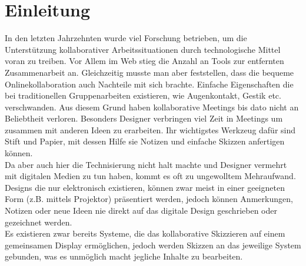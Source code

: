 \cleardoublepage
{} %

\hfill

\vfill

\begingroup
\let\cleardoublepage\relax
\chapter*{Einleitung} \label{app:introduction}
In den letzten Jahrzehnten wurde viel Forschung betrieben, um die Unterstützung kollaborativer Arbeitssituationen durch technologische Mittel voran zu treiben. Vor Allem im Web stieg die Anzahl an Tools zur entfernten Zusammenarbeit an. Gleichzeitig musste man aber feststellen, dass die bequeme Onlinekollaboration auch Nachteile mit sich brachte. Einfache Eigenschaften die bei traditionellen Gruppenarbeiten existieren, wie Augenkontakt, Gestik etc. verschwanden. Aus diesem Grund haben kollaborative Meetings bis dato nicht an Beliebtheit verloren. Besonders Designer verbringen viel Zeit in Meetings um zusammen mit anderen Ideen zu erarbeiten. Ihr wichtigstes Werkzeug dafür sind Stift und Papier, mit dessen Hilfe sie Notizen und einfache Skizzen anfertigen können.\\
Da aber auch hier die Technisierung nicht halt machte und Designer vermehrt mit digitalen Medien zu tun haben, kommt es oft zu ungewolltem Mehraufwand. Designs die nur elektronisch existieren, können zwar meist in einer geeigneten Form (z.B. mittels Projektor) präsentiert werden, jedoch können Anmerkungen, Notizen oder neue Ideen nie direkt auf das digitale Design geschrieben oder gezeichnet werden. \\
Es existieren zwar bereits Systeme, die das kollaborative Skizzieren auf einem gemeinsamen Display ermöglichen, jedoch werden Skizzen an das jeweilige System gebunden, was es unmöglich macht jegliche Inhalte zu bearbeiten.

